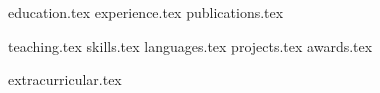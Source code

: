 \documentclass[letterpaper,11pt]{article}
\begin{document}


{education.tex}
{experience.tex}
{publications.tex}

\pagebreak

{teaching.tex}
\sidebyside
    {{skills.tex}}
    {{languages.tex}}
{projects.tex}
{awards.tex}

\pagebreak
{extracurricular.tex}
\end{document}
